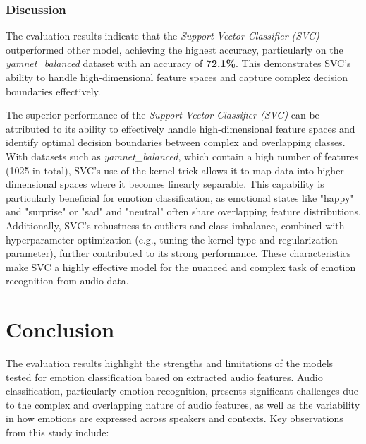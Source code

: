 \documentclass{article}
\begin{document}
\subsubsection*{Discussion}

The evaluation results indicate that the \textit{Support Vector Classifier (SVC)} outperformed other model, 
achieving the highest accuracy, particularly on the \textit{yamnet\_balanced} dataset with an accuracy 
of \textbf{72.1\%}. This demonstrates SVC's ability to handle high-dimensional feature spaces and capture complex decision 
boundaries effectively. 

The superior performance of the \textit{Support Vector Classifier (SVC)} can be attributed to its ability to effectively 
handle high-dimensional feature spaces and identify optimal decision boundaries between complex and overlapping classes. 
With datasets such as \textit{yamnet\_balanced}, which contain a high number of features (1025 in total), SVC's use of the 
kernel trick allows it to map data into higher-dimensional spaces where it becomes linearly separable. This capability is 
particularly beneficial for emotion classification, as emotional states like "happy" and "surprise" or "sad" and "neutral" 
often share overlapping feature distributions. Additionally, SVC's robustness to outliers and class imbalance, combined with 
hyperparameter optimization (e.g., tuning the kernel type and regularization parameter), further contributed to its strong 
performance. These characteristics make SVC a highly effective model for the nuanced and complex task of emotion recognition 
from audio data.



\section*{Conclusion}

The evaluation results highlight the strengths and limitations of the models tested for emotion classification 
based on extracted audio features. Audio classification, particularly emotion recognition, presents significant 
challenges due to the complex and overlapping nature of audio features, as well as the variability in how emotions 
are expressed across speakers and contexts. Key observations from this study include:
\end{document}

